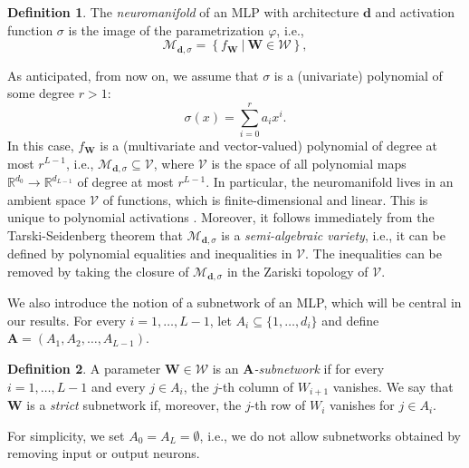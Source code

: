 \documentclass{article} %
\theoremstyle{plain}%
\theoremstyle{definition}
\newtheorem{defn}{Definition}
\theoremstyle{remark}
\begin{document}
\begin{defn}
The \emph{neuromanifold} of an MLP with architecture $\mathbf{d}$ and activation function $\sigma$ is the image of the parametrization $\varphi$, i.e.,
\begin{equation}
\mathcal{M}_{\mathbf{d}, \sigma} = \left\{f_\mathbf{W} \ | \  \mathbf{W} \in  \mathcal{W} \right\}, 
\end{equation}
\end{defn}

As anticipated, from now on, we assume that $\sigma$ is a (univariate) polynomial of some degree $r > 1$:
\begin{equation} \label{eq:sigma}
    \sigma (x) = \sum_{i=0}^r a_i x^i. 
\end{equation}
In this case, $f_{\mathbf{W}}$ is a (multivariate and vector-valued) polynomial of degree at most $r^{L-1}$, i.e., $\mathcal{M}_{\mathbf{d}, \sigma} \subseteq \mathcal{V}$, where $\mathcal{V}$ is the space of all polynomial maps $\mathbb{R}^{d_0} \rightarrow \mathbb{R}^{d_{L-1}}$ of degree at most $r^{L-1}$. In particular, the neuromanifold lives in an ambient space $\mathcal{V}$ of functions, which is finite-dimensional and linear. This is unique to polynomial activations \cite[Theorem 1]{leshno1993multilayer}. Moreover, it follows immediately from the Tarski-Seidenberg theorem that  $\mathcal{M}_{\mathbf{d}, \sigma}$ is a \emph{semi-algebraic variety}, i.e., it can be defined by polynomial equalities and inequalities in $\mathcal{V}$. The inequalities can be removed by taking the closure of $\mathcal{M}_{\mathbf{d}, \sigma}$ in the Zariski topology of $\mathcal{V}$.

We also introduce the notion of a subnetwork of an MLP, which will be central in our results. For every $i=1, \ldots, L-1$, let $A_i \subseteq \{1, \ldots,  d_i \}$ and define $\mathbf{A} = ( A_1, A_2, \ldots, A_{L-1} )$. 
\begin{defn}
A parameter $\mathbf{W} \in \mathcal{W}$ is an \emph{$\mathbf{A}$-subnetwork} if for every $i=1, \ldots, L-1$ and every $j \in A_i$, the $j$-th column of $W_{i+1}$ vanishes. We say that $\mathbf{W}$ is a \emph{strict} subnetwork if, moreover,  the $j$-th row of $W_i$ vanishes for $j \in A_i$. 
\end{defn}
 For simplicity, we set $A_0 = A_L = \emptyset$, i.e., we do not allow subnetworks obtained by removing input or output neurons.
 
\end{document}
